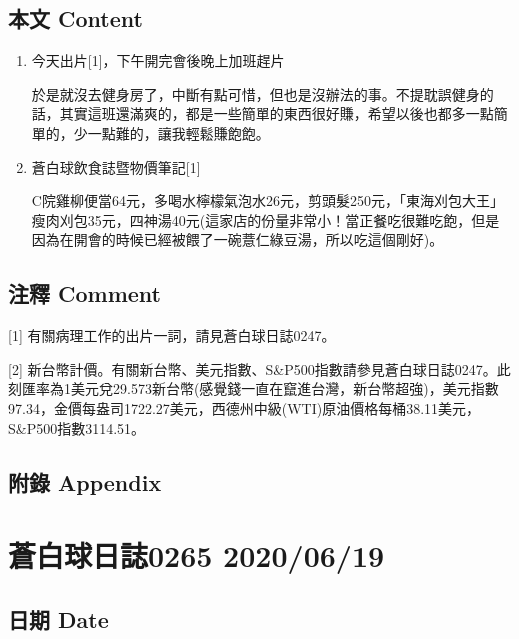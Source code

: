\documentclass[a5paper, 11pt
]{book}
\begin{document}
\hypertarget{ux672cux6587-content-15}{%
\subsection{本文 Content}\label{ux672cux6587-content-15}}

\begin{enumerate}
\def\labelenumi{\arabic{enumi}.}
\item
  今天出片{[}1{]}，下午開完會後晚上加班趕片

  於是就沒去健身房了，中斷有點可惜，但也是沒辦法的事。不提耽誤健身的話，其實這班還滿爽的，都是一些簡單的東西很好賺，希望以後也都多一點簡單的，少一點難的，讓我輕鬆賺飽飽。
\item
  蒼白球飲食誌暨物價筆記{[}1{]}

  C院雞柳便當64元，多喝水檸檬氣泡水26元，剪頭髮250元，「東海刈包大王」瘦肉刈包35元，四神湯40元(這家店的份量非常小！當正餐吃很難吃飽，但是因為在開會的時候已經被餵了一碗薏仁綠豆湯，所以吃這個剛好)。
\end{enumerate}

\hypertarget{ux6ce8ux91cb-comment-15}{%
\subsection{注釋 Comment}\label{ux6ce8ux91cb-comment-15}}

{[}1{]} 有關病理工作的出片一詞，請見蒼白球日誌0247。

{[}2{]}
新台幣計價。有關新台幣、美元指數、S\&P500指數請參見蒼白球日誌0247。此刻匯率為1美元兌29.573新台幣(感覺錢一直在竄進台灣，新台幣超強)，美元指數97.34，金價每盎司1722.27美元，西德州中級(WTI)原油價格每桶38.11美元，S\&P500指數3114.51。

\hypertarget{ux9644ux9304-appendix-15}{%
\subsection{附錄 Appendix}\label{ux9644ux9304-appendix-15}}

\hypertarget{ux84bcux767dux7403ux65e5ux8a8c0265-20200619}{%
\section{蒼白球日誌0265
2020/06/19}\label{ux84bcux767dux7403ux65e5ux8a8c0265-20200619}}

\hypertarget{ux65e5ux671f-date-16}{%
\subsection{日期 Date}\label{ux65e5ux671f-date-16}}
\end{document}
